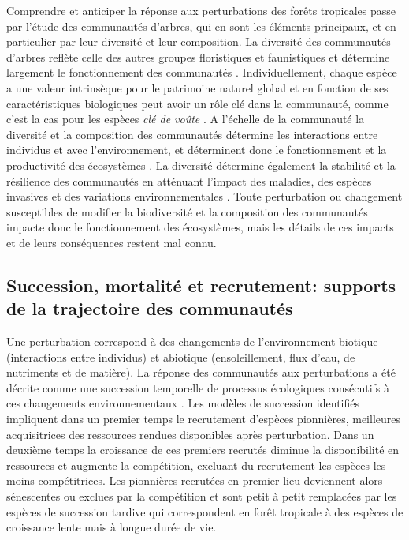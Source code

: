 \documentclass[
  11pt,
  french,
  A4paper,
  extrafontsizes,onecolumn,openright
  ]{memoir}
\begin{document}
Comprendre et anticiper la réponse aux perturbations des forêts
tropicales passe par l'étude des communautés d'arbres, qui en sont les
éléments principaux, et en particulier par leur diversité et leur
composition. La diversité des communautés d'arbres reflète celle des
autres groupes floristiques et faunistiques et détermine largement le
fonctionnement des communautés \autocite{Guitet2018}. Individuellement,
chaque espèce a une valeur intrinsèque pour le patrimoine naturel global
et en fonction de ses caractéristiques biologiques peut avoir un rôle
clé dans la communauté, comme c'est la cas pour les espèces \emph{clé de
voûte} \autocites{Jones1994}{Power1996}{Gardner2007}. A l'échelle de la
communauté la diversité et la composition des communautés détermine les
interactions entre individus et avec l'environnement, et déterminent
donc le fonctionnement et la productivité des écosystèmes
\autocite{Begon2006}. La diversité détermine également la stabilité et
la résilience des communautés en atténuant l'impact des maladies, des
espèces invasives et des variations environnementales
\autocite{Elmqvist2003}. Toute perturbation ou changement susceptibles
de modifier la biodiversité et la composition des communautés impacte
donc le fonctionnement des écosystèmes, mais les détails de ces impacts
et de leurs conséquences restent mal connu.

\subsection{Succession, mortalité et recrutement: supports de la
trajectoire des
communautés}\label{succession-mortalite-et-recrutement-supports-de-la-trajectoire-des-communautes}

Une perturbation correspond à des changements de l'environnement
biotique (interactions entre individus) et abiotique (ensoleillement,
flux d'eau, de nutriments et de matière). La réponse des communautés aux
perturbations a été décrite comme une succession temporelle de processus
écologiques consécutifs à ces changements environnementaux
\autocite{Clements1916}. Les modèles de succession identifiés impliquent
dans un premier temps le recrutement d'espèces pionnières, meilleures
acquisitrices des ressources rendues disponibles après perturbation.
Dans un deuxième temps la croissance de ces premiers recrutés diminue la
disponibilité en ressources et augmente la compétition, excluant du
recrutement les espèces les moins compétitrices. Les pionnières
recrutées en premier lieu deviennent alors sénescentes ou exclues par la
compétition et sont petit à petit remplacées par les espèces de
succession tardive qui correspondent en forêt tropicale à des espèces de
croissance lente mais à longue durée de vie.
\end{document}
